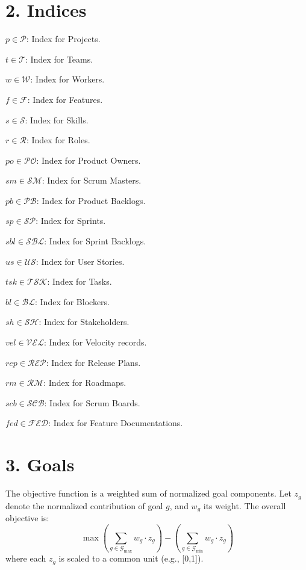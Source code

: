 \documentclass[11pt]{article}
\begin{document}
\section{2. Indices}
\item $p \in \mathcal{P}$: Index for Projects.
    \item $t \in \mathcal{T}$: Index for Teams.
    \item $w \in \mathcal{W}$: Index for Workers.
    \item $f \in \mathcal{F}$: Index for Features.
    \item $s \in \mathcal{S}$: Index for Skills.
    \item $r \in \mathcal{R}$: Index for Roles.
    \item $po \in \mathcal{PO}$: Index for Product Owners.
    \item $sm \in \mathcal{SM}$: Index for Scrum Masters.
    \item $pb \in \mathcal{PB}$: Index for Product Backlogs.
    \item $sp \in \mathcal{SP}$: Index for Sprints.
    \item $sbl \in \mathcal{SBL}$: Index for Sprint Backlogs.
    \item $us \in \mathcal{US}$: Index for User Stories.
    \item $tsk \in \mathcal{TSK}$: Index for Tasks.
    \item $bl \in \mathcal{BL}$: Index for Blockers.
    \item $sh \in \mathcal{SH}$: Index for Stakeholders.
    \item $vel \in \mathcal{VEL}$: Index for Velocity records.
    \item $rep \in \mathcal{REP}$: Index for Release Plans.
    \item $rm \in \mathcal{RM}$: Index for Roadmaps.
    \item $scb \in \mathcal{SCB}$: Index for Scrum Boards.
    \item $fed \in \mathcal{FED}$: Index for Feature Documentations.

\section{3. Goals}
The objective function is a weighted sum of normalized goal components. Let $z_g$ denote the normalized contribution of goal $g$, and $w_g$ its weight. The overall objective is:
\[
\max \left( \sum_{g \in \mathcal{G}_{\text{max}}} w_g \cdot z_g \right) - \left( \sum_{g \in \mathcal{G}_{\text{min}}} w_g \cdot z_g \right)
\]
where each $z_g$ is scaled to a common unit (e.g., [0,1]).
\end{document}
